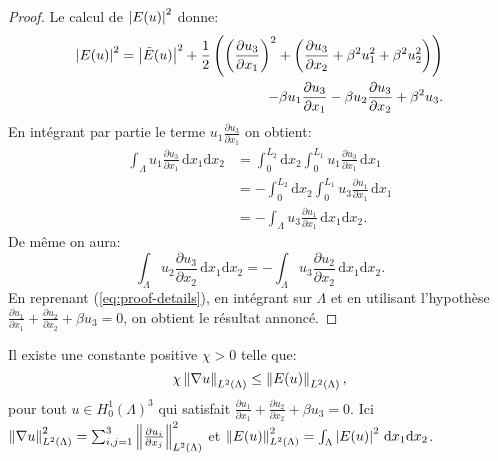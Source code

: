 \begin{proof}
  Le calcul de $\left\lvert E(u) \right\rvert^2$ donne:
  \begin{equation}\label{eq:proof-details}
    \begin{split}
      \abs{E(u)}^2 = \abs{\tilde E(u)}^2 %
      + \frac{1}{2}\parent{  \parent{\frac{\partial u_3}{\partial x_1}}^2 %
                           + \parent{\frac{\partial u_3}{\partial x_2} %
                                     + \beta^2u_1^2 %
                                     + \beta^2 u_2^2}}\\
      - \beta u_1 \frac{\partial u_3}{\partial x_1} %
      - \beta u_2 \frac{\partial u_3}{\partial x_2} %
      + \beta^2 u_3.
    \end{split}
  \end{equation}
  En intégrant par partie le terme $u_1 \frac{\partial u_3}{\partial x_1}$ on obtient:
  \begin{equation}
    \begin{split}
      \int_\Lambda u_1 \frac{\partial u_3}{\partial x_1}\,\mathrm dx_1\mathrm dx_2 %
      &= \int_0^{L_2}\mathrm dx_2\int_0^{L_1} %
           u_1 \frac{\partial u_3}{\partial x_1}\,\mathrm dx_1\\
      &= - \int_0^{L_2}\mathrm dx_2 \int_0^{L_1} %
           u_3 \frac{\partial u_1}{\partial x_1}\,\mathrm dx_1\\
      &= - \int_\Lambda %
           u_3 \frac{\partial u_1}{\partial x_1}\,\mathrm dx_1\mathrm dx_2.
    \end{split}
  \end{equation}
  De même on aura:
  \begin{equation}
    \int_\Lambda u_2 \frac{\partial u_3}{\partial x_2}\,\mathrm dx_1\mathrm dx_2 %
    = - \int_\Lambda u_3 \frac{\partial u_2}{\partial x_2}\,\mathrm dx_1\mathrm dx_2.
  \end{equation}
  En reprenant (\ref{eq:proof-details}), en intégrant sur $\Lambda$
  et en utilisant l'hypothèse $\frac{\partial u_1}{\partial x_1} +
  \frac{\partial u_2}{\partial x_2} + \beta u_3 = 0$, on obtient le
  résultat annoncé.
\end{proof}

\begin{lemme}\label{lem:lemme-2}
  Il existe une constante positive $\chi > 0$ telle que:
  \begin{equation}
    \chi \left\lVert \nabla u \right\rVert_{L^2(\Lambda)} \leq \left\lVert E(u) \right\rVert_{L^2(\Lambda)},
  \end{equation}
  pour tout $u\in H_0^1(\Lambda)^3$ qui satisfait $\frac{\partial
    u_1}{\partial x_1} + \frac{\partial u_2}{\partial x_2} + \beta u_3
  = 0$. Ici $\left\lVert \nabla u \right\rVert^2_{L^2(\Lambda)} =
  \sum_{i,j=1}^3\left\lVert \frac{\partial u_i}{\partial
      x_j} \right\rVert^2_{L^2(\Lambda)}$ et $\left\lVert E(u) \right\rVert^2_{L^2(\Lambda)} =
  \int_\Lambda\left\lvert E(u) \right\rvert^2\,\mathrm dx_1\mathrm dx_2$.
\end{lemme}

